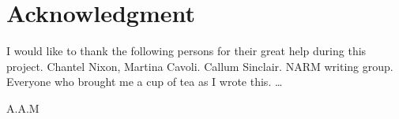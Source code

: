 \section*{Acknowledgment}
I would like to thank the following persons for their great help during this project. Chantel Nixon, Martina Cavoli. Callum Sinclair. NARM writing group. Everyone who brought me a cup of tea as I wrote this. \ldots



\begin{flushright}
A.A.M\\[1pc]

\end{flushright}